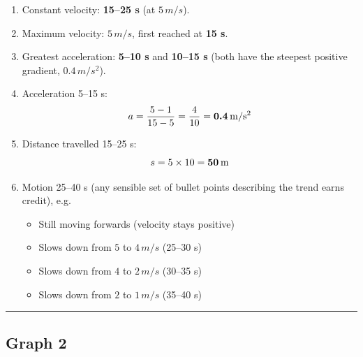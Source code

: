 \documentclass[12pt]{article}
\begin{document}
\begin{enumerate}[label=\textbf{1.\arabic*}]
  \item Constant velocity: \textbf{15--25 s} (at $5\,\si{m/s}$).

  \item Maximum velocity: \textbf{$5\,\si{m/s}$}, first reached at \textbf{15 s}.

  \item Greatest acceleration: \textbf{5--10 s} and \textbf{10--15 s} 
  (both have the steepest positive gradient, $0.4\,\si{m/s^2}$).

  \item Acceleration 5--15 s:
  \[
  a=\frac{5-1}{15-5}=\frac{4}{10}=\textbf{0.4\,\si{m/s^2}}
  \]

  \item Distance travelled 15--25 s:
  \[
  s = 5 \times 10 = \textbf{50\,\si{m}}
  \]

  \item Motion 25--40 s (any sensible set of bullet points describing the trend earns credit), e.g.
  \begin{itemize}
    \item Still moving forwards (velocity stays positive)
    \item Slows down from $5$ to $4\,\si{m/s}$ (25--30 s)
    \item Slows down from $4$ to $2\,\si{m/s}$ (30--35 s)
    \item Slows down from $2$ to $1\,\si{m/s}$ (35--40 s)
  \end{itemize}
\end{enumerate}

\hrule
\vspace{4mm}

\subsection*{Graph 2}
\end{document}
